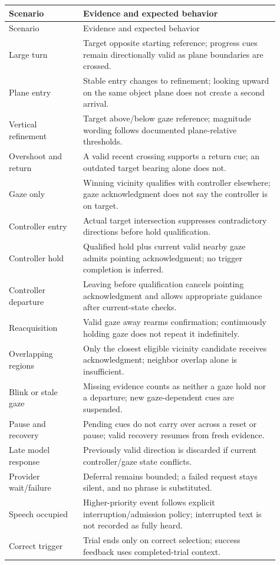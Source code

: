\begin{longtable}{@{}p{0.25\linewidth}p{0.66\linewidth}@{}}
\toprule
Scenario & Evidence and expected behavior \\\midrule\endfirsthead
\toprule Scenario & Evidence and expected behavior \\\midrule\endhead
Large turn & Target opposite starting reference; progress cues remain directionally valid as plane boundaries are crossed.\\
Plane entry & Stable entry changes to refinement; looking upward on the same object plane does not create a second arrival.\\
Vertical refinement & Target above/below gaze reference; magnitude wording follows documented plane-relative thresholds.\\
Overshoot and return & A valid recent crossing supports a return cue; an outdated target bearing alone does not.\\
Gaze only & Winning vicinity qualifies with controller elsewhere; gaze acknowledgment does not say the controller is on target.\\
Controller entry & Actual target intersection suppresses contradictory directions before hold qualification.\\
Controller hold & Qualified hold plus current valid nearby gaze admits pointing acknowledgment; no trigger completion is inferred.\\
Controller departure & Leaving before qualification cancels pointing acknowledgment and allows appropriate guidance after current-state checks.\\
Reacquisition & Valid gaze away rearms confirmation; continuously holding gaze does not repeat it indefinitely.\\
Overlapping regions & Only the closest eligible vicinity candidate receives acknowledgment; neighbor overlap alone is insufficient.\\
Blink or stale gaze & Missing evidence counts as neither a gaze hold nor a departure; new gaze-dependent cues are suspended.\\
Pause and recovery & Pending cues do not carry over across a reset or pause; valid recovery resumes from fresh evidence.\\
Late model response & Previously valid direction is discarded if current controller/gaze state conflicts.\\
Provider wait/failure & Deferral remains bounded; a failed request stays silent, and no phrase is substituted.\\
Speech occupied & Higher-priority event follows explicit interruption/admission policy; interrupted text is not recorded as fully heard.\\
Correct trigger & Trial ends only on correct selection; success feedback uses completed-trial context.\\\bottomrule
\end{longtable}
\endgroup

